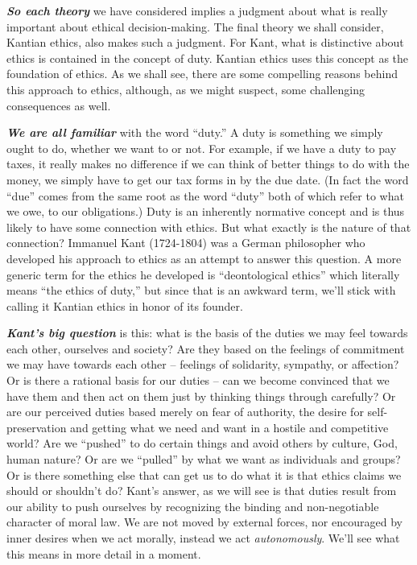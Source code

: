 \documentclass[
  12pt, openany]{book}
\theoremstyle{definition}
\theoremstyle{definition}
\theoremstyle{definition}
\theoremstyle{definition}
\theoremstyle{remark}
\begin{document}
\textbf{\emph{So each theory}} we have considered implies a judgment about what is really important about ethical decision-making. The final theory we shall consider, Kantian ethics, also makes such a judgment. For Kant, what is distinctive about ethics is contained in the concept of duty. Kantian ethics uses this concept as the foundation of ethics. As we shall see, there are some compelling reasons behind this approach to ethics, although, as we might suspect, some challenging consequences as well.

\textbf{\emph{We are all familiar}} with the word ``duty.'' A duty is something we simply ought to do, whether we want to or not. For example, if we have a duty to pay taxes, it really makes no difference if we can think of better things to do with the money, we simply have to get our tax forms in by the due date. (In fact the word ``due'' comes from the same root as the word ``duty'' both of which refer to what we owe, to our obligations.) Duty is an inherently normative concept and is thus likely to have some connection with ethics. But what exactly is the nature of that connection? Immanuel Kant (1724-1804) was a German philosopher who developed his approach to ethics as an attempt to answer this question. A more generic term for the ethics he developed is ``deontological ethics'' which literally means ``the ethics of duty,'' but since that is an awkward term, we'll stick with calling it Kantian ethics in honor of its founder.

\textbf{\emph{Kant's big question}} is this: what is the basis of the duties we may feel towards each other, ourselves and society? Are they based on the feelings of commitment we may have towards each other -- feelings of solidarity, sympathy, or affection? Or is there a rational basis for our duties -- can we become convinced that we have them and then act on them just by thinking things through carefully? Or are our perceived duties based merely on fear of authority, the desire for self-preservation and getting what we need and want in a hostile and competitive world? Are we ``pushed'' to do certain things and avoid others by culture, God, human nature? Or are we ``pulled'' by what we want as individuals and groups? Or is there something else that can get us to do what it is that ethics claims we should or shouldn't do? Kant's answer, as we will see is that duties result from our ability to push ourselves by recognizing the binding and non-negotiable character of moral law. We are not moved by external forces, nor encouraged by inner desires when we act morally, instead we act \emph{autonomously}. We'll see what this means in more detail in a moment.
\end{document}

